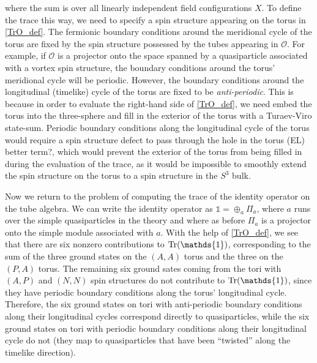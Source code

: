 \documentclass[12pt,a4paper]{article}
\newcommand{\unit}{\mathds{1}}
\newcommand{\mco}{\mathcal{O}}
\newcommand{\ethan}[1]{{\color{amethyst}\footnotesize{(EL) #1}}}
\begin{document}
where the sum is over all linearly independent field configurations $X$. 
To define the trace this way, we need to specify a spin structure appearing on the torus in \eqref{TrO_def}. 
The fermionic boundary conditions around the meridional cycle of the torus are fixed by the spin structure possessed 
by the tubes appearing in $\mco$.
For example, if $\mco$ is a projector onto the space spanned by a quasiparticle associated with a vortex spin structure, 
the boundary conditions around the torus' meridional cycle will be periodic. 
However, the boundary conditions around the longitudinal (timelike) cycle of the torus are fixed to be {\it anti-periodic}. 
This is because in order to evaluate the right-hand side of \eqref{TrO_def}, we need embed the torus into the three-sphere 
and fill in the exterior of the torus with a Turaev-Viro state-sum. 
Periodic boundary conditions along the longitudinal cycle of the torus would require a spin structure defect to 
pass through the hole in the torus 
\ethan{better term?}, which would prevent the exterior of the torus from being filled in during the 
evaluation of the trace, as it would be impossible to smoothly extend the spin structure on the torus 
to a spin structure in the $S^3$ bulk. 

Now we return to the problem of computing the trace of the identity operator on the tube algebra. 
We can write the identity operator as $\unit = \oplus_a\Pi_a$, where $a$ runs over the simple quasiparticles 
in the theory and where as before $\Pi_a$ is a projector onto the simple module associated with $a$.  
With the help of \eqref{TrO_def}, we see that there are six nonzero contributions to ${\rm Tr}(\unit)$, 
corresponding to the sum of the three ground states on the $(A,A)$ torus and the three on the $(P,A)$ torus. 
The remaining six ground sates coming from the tori with $(A,P)$ and $(N,N)$ spin structures do not contribute 
to ${\rm Tr}(\unit)$, since they have periodic boundary conditions along the torus' longitudinal cycle. 
Therefore, the six ground states on tori with anti-periodic boundary conditions along their longitudinal cycles 
correspond directly to quasiparticles, while the six ground states on tori with periodic boundary conditions 
along their longitudinal cycle do not (they map to quasiparticles that have been ``twisted'' along the timelike direction). 

 
 

 
\end{document}
